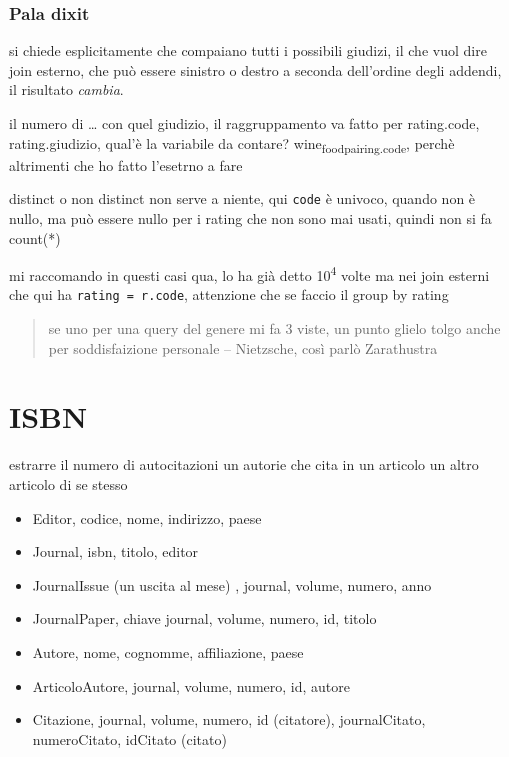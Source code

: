 \documentclass[11pt]{article}
\begin{document}
\subsubsection{Pala dixit}
\label{sec:orgfd91377}
si chiede esplicitamente che compaiano tutti i possibili giudizi, il che vuol dire join
esterno, che può essere sinistro o destro a seconda dell'ordine degli addendi, il
risultato \emph{cambia}.

il numero di \ldots{} con quel giudizio, il raggruppamento va fatto per rating.code,
rating.giudizio, qual'è la variabile da contare? wine\textsubscript{food}\textsubscript{pairing.code}, perchè altrimenti
che ho fatto l'esetrno a fare

distinct o non distinct non serve a niente, qui \texttt{code} è univoco, quando non è nullo, ma
può essere nullo per i rating che non sono mai usati, quindi non si fa count(*)

mi raccomando in questi casi qua, lo ha già detto 10\textsuperscript{4} volte ma nei join esterni che qui
ha \texttt{rating = r.code}, attenzione che se faccio il group by rating

\begin{quote}
se uno per una query del genere mi fa 3 viste,
un punto glielo tolgo anche per soddisfaizione personale
 -- Nietzsche, così parlò Zarathustra
\end{quote}

\section{ISBN}
\label{sec:orgf79e129}
estrarre il numero di autocitazioni
un autorie che cita in un articolo un altro articolo di se stesso

\begin{itemize}
\item Editor, codice, nome, indirizzo, paese
\item Journal, isbn, titolo, editor
\item JournalIssue (un uscita al mese) , journal, volume, numero, anno
\item JournalPaper, chiave journal, volume, numero, id, titolo
\item Autore, nome, cognomme, affiliazione, paese
\item ArticoloAutore, journal, volume, numero, id, autore
\item Citazione, journal, volume, numero, id (citatore),
journalCitato, numeroCitato, idCitato (citato)
\end{itemize}
\end{document}
